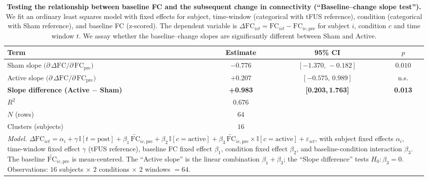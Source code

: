     
        \begin{table}[t]
            \centering
            \caption{\textbf{Testing the relationship between baseline FC and the subsequent change in connectivity (``Baseline--change slope test'').} We fit an ordinary least squares model with fixed effects for subject, time-window (categorical with tFUS reference), condition (categorical with Sham reference), and baseline FC (z-scored). The dependent variable is $\Delta \mathrm{FC}_{ict} = \mathrm{FC}_{ict} - \mathrm{FC}_{ic,\mathrm{pre}}$ for subject $i$, condition $c$ and time window $t$. We assay whether the baseline--change slopes are significantly different between Sham and Active.}
            \label{tab:rtm_slope_pooled}
            \setlength{\tabcolsep}{10pt}
            \begin{tabular}{lccc}
            \toprule
            \textbf{Term} & \textbf{Estimate} & \textbf{95\% CI} & \textbf{$p$} \\
            \midrule
            Sham slope $\big(\partial\,\Delta\mathrm{FC}/\partial\,\mathrm{FC}_{\text{pre}}\big)$
            & $-0.776$ & $[-1.370,\,-0.182]$ & $0.010$ \\
            Active slope $\big(\partial\,\Delta\mathrm{FC}/\partial\,\mathrm{FC}_{\text{pre}}\big)$
            & $+0.207$ & $[-0.575,\,0.989]$ & n.s. \\
            \addlinespace[2pt]
            \textbf{Slope difference (Active $-$ Sham)} & \textbf{+0.983} & \textbf{[0.203,\,1.763]} & \textbf{0.013} \\
            \midrule
            $R^2$ & $0.676$ & & \\
            $N$ (rows) & $64$ & & \\
            Clusters (subjects) & $16$ & & \\
            \bottomrule
            \multicolumn{4}{p{0.9\linewidth}}{\footnotesize
            \textit{Model.}
            $\Delta \mathrm{FC}_{ict}
            = \alpha_i
            + \gamma\,\mathbb{I}[t=\mathrm{post}]
            + \beta_1\,\widetilde{\mathrm{FC}}_{ic,\mathrm{pre}}
            + \beta_2\,\mathbb{I}[c=\mathrm{active}]
            + \beta_3\,\widetilde{\mathrm{FC}}_{ic,\mathrm{pre}}\times \mathbb{I}[c=\mathrm{active}]
            + \varepsilon_{ict}$,
            with subject fixed effects $\alpha_i$, time-window fixed effect $\gamma$ (tFUS reference), baseline FC fixed effect $\beta_1$, condition fixed effect $\beta_2$, and baseline-condition interaction $\beta_3$.
            The baseline $\widetilde{\mathrm{FC}}_{ic,\mathrm{pre}}$ is mean-centered.
            The ``Active slope'' is the linear combination $\beta_1+\beta_3$; the ``Slope difference'' tests $H_0\!:\beta_3=0$.
            Observations: $16$ subjects $\times$ $2$ conditions $\times$ $2$ windows $=64$.}
            \end{tabular}
            \end{table}


